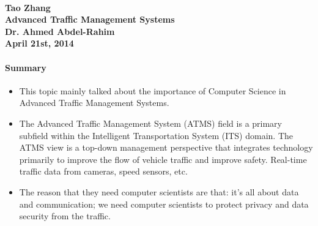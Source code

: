 \documentclass[12pt]{article}
\begin{document}
\paragraph{Tao Zhang\\Advanced Traffic Management Systems\\Dr. Ahmed Abdel-Rahim\\April 21st, 2014}

\paragraph{Summary}

\begin{itemize}
\item This topic mainly talked about the importance of Computer Science in Advanced Traffic Management Systems. 
\item The Advanced Traffic Management System (ATMS) field is a primary subfield within the Intelligent Transportation System (ITS) domain. The ATMS view is a top-down management perspective that integrates technology primarily to improve the flow of vehicle traffic and improve safety. Real-time traffic data from cameras, speed sensors, etc.
\item The reason that they need computer scientists are that: it's all about data and communication; we need computer scientists to protect privacy and data security from the traffic.
\end{itemize}
\end{document}
